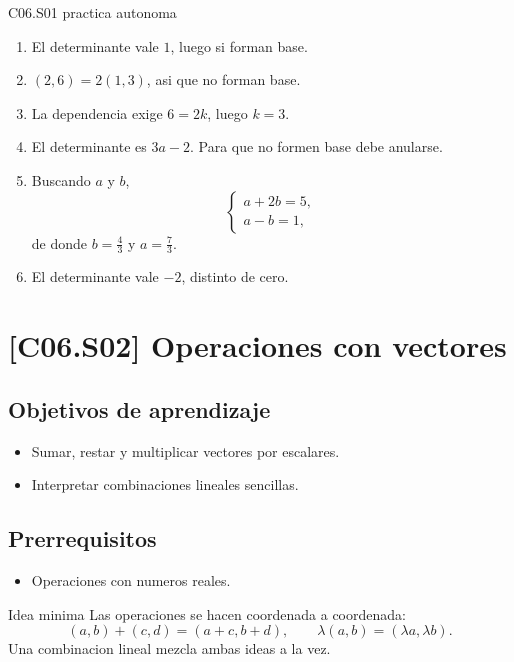 \begin{fullsolution}{C06.S01 practica autonoma}
\begin{enumerate}[label=\textbf{PX-C06.S01-\arabic*:}, leftmargin=*]
  \item El determinante vale \(1\), luego si forman base.
  \item \((2,6)=2(1,3)\), asi que no forman base.
  \item La dependencia exige \(6=2k\), luego \(k=3\).
  \item El determinante es \(3a-2\). Para que no formen base debe anularse.
  \item Buscando \(a\) y \(b\),
  \[
  \begin{cases}
  a+2b=5,\\
  a-b=1,
  \end{cases}
  \]
  de donde \(b=\frac{4}{3}\) y \(a=\frac{7}{3}\).
  \item El determinante vale \(-2\), distinto de cero.
\end{enumerate}
\end{fullsolution}

\section{[C06.S02] Operaciones con vectores}

\subsection*{Objetivos de aprendizaje}
\begin{itemize}
  \item Sumar, restar y multiplicar vectores por escalares.
  \item Interpretar combinaciones lineales sencillas.
\end{itemize}

\subsection*{Prerrequisitos}
\begin{itemize}
  \item Operaciones con numeros reales.
\end{itemize}

\begin{theorybox}{Idea minima}
Las operaciones se hacen coordenada a coordenada:
\[
(a,b)+(c,d)=(a+c,b+d),
\qquad
\lambda(a,b)=(\lambda a,\lambda b).
\]
Una combinacion lineal mezcla ambas ideas a la vez.
\end{theorybox}

